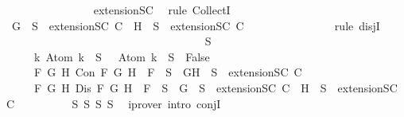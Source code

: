 \begin{isabellebody}
\ \ \ \ \ \ \ \ \ \ \ \ \ \ \isamarkupfalse%
\ extensionSC\ \isamarkupfalse%
\ {\isacharparenleft}rule\ CollectI{\isacharparenright}\isanewline
\ \ \ \ \ \ \ \ \ \ \ \ \isamarkupfalse%
\ {\isachardoublequoteopen}{\isacharbraceleft}G{\isacharbraceright}\ {\isasymunion}\ S{\isacharprime}\ {\isasymin}\ {\isacharparenleft}extensionSC\ C{\isacharparenright}\ {\isasymor}\ {\isacharbraceleft}H{\isacharbraceright}\ {\isasymunion}\ S{\isacharprime}\ {\isasymin}\ {\isacharparenleft}extensionSC\ C{\isacharparenright}{\isachardoublequoteclose}\isanewline
\ \ \ \ \ \ \ \ \ \ \ \ \ \ \isamarkupfalse%
\ {\isacharparenleft}rule\ disjI{}{\isacharparenright}\isanewline
\ \ \ \ \ \ \ \ \ \ \isamarkupfalse%
\isanewline
\ \ \ \ \ \ \ \ \isamarkupfalse%
\isanewline
\ \ \ \ \ \ \isamarkupfalse%
\isanewline
\ \ \ \ \ \ \isamarkupfalse%
\ {\isachardoublequoteopen}{\isasymbottom}\ {\isasymnotin}\ S{\isacharprime}\isanewline
\ \ \ \ {\isasymand}\ {\isacharparenleft}{\isasymforall}k{\isachardot}\ Atom\ k\ {\isasymin}\ S{\isacharprime}\ {\isasymlongrightarrow}\ \isactrlbold {\isasymnot}\ {\isacharparenleft}Atom\ k{\isacharparenright}\ {\isasymin}\ S{\isacharprime}\ {\isasymlongrightarrow}\ False{\isacharparenright}\isanewline
\ \ \ \ {\isasymand}\ {\isacharparenleft}{\isasymforall}F\ G\ H{\isachardot}\ Con\ F\ G\ H\ {\isasymlongrightarrow}\ F\ {\isasymin}\ S{\isacharprime}\ {\isasymlongrightarrow}\ {\isacharbraceleft}G{\isacharcomma}H{\isacharbraceright}\ {\isasymunion}\ S{\isacharprime}\ {\isasymin}\ {\isacharparenleft}extensionSC\ C{\isacharparenright}{\isacharparenright}\isanewline
\ \ \ \ {\isasymand}\ {\isacharparenleft}{\isasymforall}F\ G\ H{\isachardot}\ Dis\ F\ G\ H\ {\isasymlongrightarrow}\ F\ {\isasymin}\ S{\isacharprime}\ {\isasymlongrightarrow}\ {\isacharbraceleft}G{\isacharbraceright}\ {\isasymunion}\ S{\isacharprime}\ {\isasymin}\ {\isacharparenleft}extensionSC\ C{\isacharparenright}\ {\isasymor}\ {\isacharbraceleft}H{\isacharbraceright}\ {\isasymunion}\ S{\isacharprime}\ {\isasymin}\ {\isacharparenleft}extensionSC\ C{\isacharparenright}{\isacharparenright}{\isachardoublequoteclose}\isanewline
\ \ \ \ \ \ \ \ \isamarkupfalse%
\ S{}\ S{}\ S{}\ S{}\ \isamarkupfalse%
\ {\isacharparenleft}iprover\ intro{\isacharcolon}\ conjI{\isacharparenright}\isanewline
\ \ \ \ \isamarkupfalse%
\isanewline
\ \ \isamarkupfalse%
\isanewline

\end{isabellebody}
